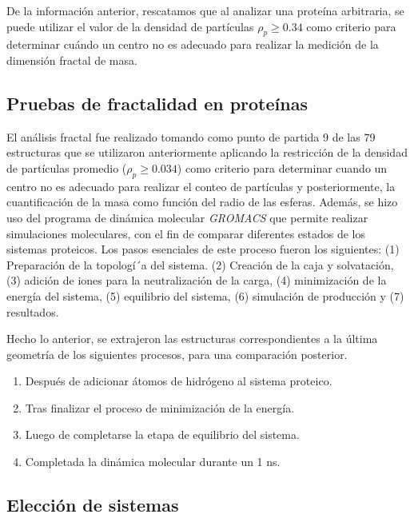  	De la informaci\'{o}n anterior, rescatamos que al analizar una prote\'{i}na arbitraria, se puede utilizar el valor de la densidad de part\'{i}culas $\rho_{p} \geq 0.34$ como criterio para determinar cu\'{a}ndo un centro no es adecuado para realizar la medici\'{o}n de la dimensi\'{o}n fractal de masa. 
 	
 	
	\subsection{Pruebas de fractalidad en prote\'{i}nas}
	\label{subsec:pfp}

 	
 	El an\'{a}lisis fractal fue realizado tomando como punto de partida 9 de las 79 estructuras que se utilizaron anteriormente aplicando la restricci\'{o}n de la densidad de part\'{i}culas  promedio ($\rho_{p} \geq 0.034$) como criterio para determinar cuando un centro no es adecuado para realizar el conteo de part\'{i}culas y posteriormente, la cuantificaci\'{o}n de la masa como funci\'{o}n del radio de las esferas. Adem\'{a}s, se hizo uso del programa de din\'{a}mica molecular \textit{GROMACS}\cite{Lemkul2024, Abraham2015} que permite realizar simulaciones moleculares, con el fin de comparar diferentes estados de los sistemas proteicos. Los pasos esenciales de este proceso fueron los siguientes: (1) Preparaci\'{o}n de la topolog\'{i´}a del sistema. (2) Creaci\'{o}n de la caja y solvataci\'{o}n, (3) adici\'{o}n de iones para la neutralizaci\'{o}n de la carga, (4) minimizaci\'{o}n de la energ\'{i}a del sistema, (5) equilibrio del sistema, (6) simulaci\'{o}n de producci\'{o}n y (7) resultados.
 	
 	
 	
 	Hecho lo anterior, se extrajeron las estructuras correspondientes a la \'{u}ltima 
 	geometr\'{i}a de los siguientes procesos, para una comparaci\'{o}n posterior.
 	
 	\begin{enumerate}
 		\item Despu\'{e}s de adicionar \'{a}tomos de hidr\'{o}geno al sistema proteico. 
 		\item Tras finalizar el proceso de minimizaci\'{o}n de la energ\'{i}a.
 		\item Luego de completarse la etapa de equilibrio del sistema.
 		\item Completada la din\'{a}mica molecular durante un 1 ns.
 	\end{enumerate}
 	
 	
 	\subsection{Elecci\'{o}n de sistemas}
 	\label{subsec:eleccionsis}
 	
